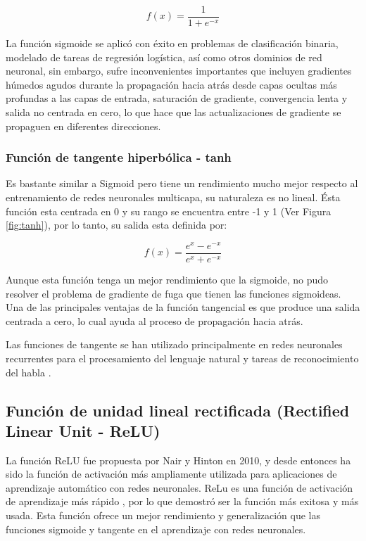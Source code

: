 \begin{equation}
f(x) = \frac{1}{1+e^{-x}}
\end{equation}

La funci\'{o}n sigmoide se aplic\'{o} con éxito en problemas de clasificación binaria, modelado de tareas de regresión logística, así como otros dominios de red neuronal, sin embargo, sufre inconvenientes importantes que incluyen gradientes húmedos agudos durante la propagación hacia atrás desde capas ocultas más profundas a las capas de entrada, saturación de gradiente, convergencia lenta y salida no centrada en cero, lo que hace que las actualizaciones de gradiente se propaguen en diferentes direcciones.

\subsubsection{Funci\'{o}n de tangente hiperb\'{o}lica - tanh}

Es bastante similar a Sigmoid pero tiene un rendimiento mucho mejor respecto al entrenamiento de redes neuronales multicapa, su naturaleza es no lineal. \'{E}sta funci\'{o}n esta centrada en 0 y su rango se encuentra entre -1 y 1 (Ver Figura \ref{fig:tanh}), por lo tanto, su salida esta definida por:

\begin{equation}
f(x)=\frac{e^{x}-e^{-x}}{e^{x}+e^{-x}}
\end{equation}
    
Aunque esta funci\'{o}n tenga un mejor rendimiento que la sigmoide, no pudo resolver el problema de gradiente de fuga que tienen las funciones sigmoideas. Una de las principales ventajas de la funci\'{o}n tangencial es que produce una salida centrada a cero, lo cual ayuda al proceso de propagaci\'{o}n hacia atr\'{a}s.

\vspace{5mm} %

Las funciones de tangente se han utilizado principalmente en redes neuronales recurrentes para el procesamiento del lenguaje natural \cite{43} y tareas de reconocimiento del habla \cite{44}.
    
\subsection{Funci\'{o}n de unidad lineal rectificada (Rectified Linear Unit - ReLU)}

La funci\'{o}n ReLU fue propuesta por Nair y Hinton en 2010, y desde entonces ha sido la funci\'{o}n de activaci\'{o}n m\'{a}s ampliamente utilizada para aplicaciones de aprendizaje autom\'{a}tico con redes neuronales. ReLu es una funci\'{o}n de activaci\'{o}n de aprendizaje m\'{a}s r\'{a}pido \cite{46}, por lo que demostr\'{o} ser la funci\'{o}n m\'{a}s exitosa y m\'{a}s usada. Esta funci\'{o}n ofrece un mejor rendimiento y generalizaci\'{o}n que las funciones sigmoide y tangente en el aprendizaje con redes neuronales.

